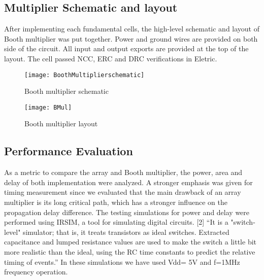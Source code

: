\documentclass[conference]{IEEEtran}
\begin{document}
\subsection{Multiplier Schematic and layout}
After implementing each fundamental cells, the high-level schematic and layout of Booth multiplier was put together. Power and ground wires are provided on both side of the circuit. All input and output exports are provided at the top of the layout. The cell passed NCC, ERC and DRC verifications in Eletric.

\begin{figure}[!htb]
\centering
\texttt{[image: BoothMultiplierschematic]}
\caption{Booth multiplier schematic}
\label{fig_sim}
\end{figure}

\begin{figure}[!htb]
\centering
\texttt{[image: BMul]}
\caption{Booth multiplier layout}
\label{fig_sim}
\end{figure}

\subsection{Performance Evaluation}
As a metric to compare the array and Booth multiplier, the power, area and delay of both implementation were analyzed. A stronger emphasis was given for timing measurement since we evaluated that the main drawback of an array multiplier is its long critical path, which has a stronger influence on the propagation delay difference. The testing simulations for power and delay were performed using IRSIM, a tool for simulating digital circuits. [2] “It is a "switch-level" simulator; that is, it treats transistors as ideal switches. Extracted capacitance and lumped resistance values are used to make the switch a little bit more realistic than the ideal, using the RC time constants to predict the relative timing of events.” In these simulations we have used Vdd= 5V and f=1MHz frequency operation. 
\end{document}
